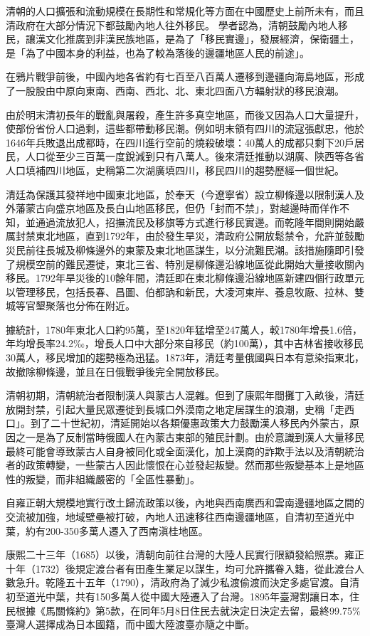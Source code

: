 清朝的人口擴張和流動規模在長期性和常規化等方面在中國歷史上前所未有，而且清政府在大部分情況下都鼓勵內地人往外移民。 學者認為，清朝鼓勵內地人移民，讓漢文化推廣到非漢民族地區，是為了「移民實邊」，發展經濟，保衛疆土，是「為了中國本身的利益，也為了較為落後的邊疆地區人民的前途」。

在鴉片戰爭前後，中國內地各省約有七百至八百萬人遷移到邊疆向海島地區，形成了一股股由中原向東南、西南、西北、北、東北四面八方輻射狀的移民浪潮。

由於明末清初長年的戰亂與屠殺，產生許多真空地區，而後又因為人口大量提升，使部份省份人口過剩，這些都帶動移民潮。例如明末領有四川的流寇張獻忠，他於1646年兵敗退出成都時，在四川進行空前的燒殺破壞：40萬人的成都只剩下20戶居民，人口從至少三百萬一度銳減到只有八萬人。後來清廷推動以湖廣、陝西等各省人口填補四川地區，史稱第二次湖廣填四川，移民四川的趨勢歷經一個世紀。

清廷為保護其發祥地中國東北地區，於奉天（今遼寧省）設立柳條邊以限制漢人及外藩蒙古向盛京地區及長白山地區移民，但仍「封而不禁」，對越邊時而佯作不知，並通過流放犯人，招撫流民及移旗等方式進行移民實邊。而乾隆年間則開始嚴厲封禁東北地區，直到1792年，由於發生旱災，清政府公開放鬆禁令，允許並鼓勵災民前往長城及柳條邊外的東蒙及東北地區謀生，以分流難民潮。該措施隨即引發了規模空前的難民遷徙，東北三省、特別是柳條邊沿線地區從此開始大量接收關內移民。1792年旱災後的10餘年間，清廷即在東北柳條邊沿線地區新建四個行政單元以管理移民，包括長春、昌圖、伯都訥和新民，大凌河東岸、養息牧廠、拉林、雙城等官墾聚落也分佈在附近。

據統計，1780年東北人口約95萬，至1820年猛增至247萬人，較1780年增長1.6倍，年均增長率24.2‰，增長人口中大部分來自移民（約100萬），其中吉林省接收移民30萬人，移民增加的趨勢極為迅猛。1873年，清廷考量俄國與日本有意染指東北，故撤除柳條邊，並且在日俄戰爭後完全開放移民。

清朝初期，清朝統治者限制漢人與蒙古人混雜。但到了康熙年間攤丁入畝後，清廷放開封禁，引起大量民眾遷徙到長城口外漠南之地定居謀生的浪潮，史稱「走西口」。到了二十世紀初，清延開始以各類優惠政策大力鼓勵漢人移民內外蒙古，原因之一是為了反制當時俄國人在內蒙古東部的殖民計劃。由於意識到漢人大量移民最終可能會導致蒙古人自身被同化或全面漢化，加上漢商的詐欺手法以及清朝統治者的政策轉變，一些蒙古人因此懷恨在心並發起叛變。然而那些叛變基本上是地區性的叛變，而非組織嚴密的「全區性暴動」。

自雍正朝大規模地實行改土歸流政策以後，內地與西南廣西和雲南邊疆地區之間的交流被加強，地域壁壘被打破，內地人迅速移往西南邊疆地區，自清初至道光中葉，約有200-350多萬人遷入了西南滇桂地區。

康熙二十三年（1685）以後，清朝向前往台灣的大陸人民實行限額發給照票。雍正十年（1732）後規定渡台者有田產生業足以謀生，均可允許攜眷入籍，從此渡台人數急升。乾隆五十五年（1790），清政府為了減少私渡偷渡而決定多處官渡。自清初至道光中葉，共有150多萬人從中國大陸遷入了台灣。1895年臺灣割讓日本，住民根據《馬關條約》第5款，在同年5月8日住民去就決定日決定去留，最終99.75\%臺灣人選擇成為日本國籍，而中國大陸渡臺亦隨之中斷。

